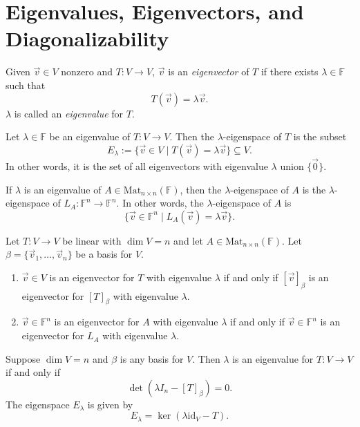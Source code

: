 \documentclass{article}
\newcommand{\secbreak}{\noindent \hrulefill \vspace{1cm}}
\begin{document}
\secbreak

\section*{Eigenvalues, Eigenvectors, and Diagonalizability}

\begin{definition}
Given \( \vec{v} \in V \) nonzero and \( T: V \to V \), \(\vec{v}\) is an \emph{eigenvector} of \( T \) if there exists \(\lambda \in \mathbb{F}\) such that 
\[
T(\vec{v}) = \lambda \vec{v}.
\]
\(\lambda\) is called an \emph{eigenvalue} for \( T \).
\end{definition}

\begin{definition}[Eigenspace]
Let \( \lambda \in \mathbb{F} \) be an eigenvalue of \( T: V \to V \). Then the \(\lambda\)-eigenspace of \( T \) is the subset 
\[
E_{\lambda} := \{ \vec{v} \in V \mid T(\vec{v}) = \lambda \vec{v} \} \subseteq V.
\]
In other words, it is the set of all eigenvectors with eigenvalue \(\lambda\) union \(\{\vec{0}\}\).

If \( \lambda \) is an eigenvalue of \( A \in \mathrm{Mat}_{n \times n}(\mathbb{F}) \), then the \(\lambda\)-eigenspace of \( A \) is the \(\lambda\)-eigenspace of \( L_A: \mathbb{F}^n \to \mathbb{F}^n \). In other words, the \(\lambda\)-eigenspace of \( A \) is 
\[
\{ \vec{v} \in \mathbb{F}^n \mid L_A(\vec{v}) = \lambda \vec{v} \}.
\]
\end{definition}

\begin{lemma}
Let \( T: V \to V \) be linear with \(\dim V = n\) and let \( A \in \mathrm{Mat}_{n \times n}(\mathbb{F}) \). Let \( \beta = \{ \vec{v}_1, \ldots, \vec{v}_n \} \) be a basis for \( V \).
\begin{enumerate}
    \item \( \vec{v} \in V \) is an eigenvector for \( T \) with eigenvalue \(\lambda\) if and only if \( [\vec{v}]_{\beta} \) is an eigenvector for \( [T]_{\beta} \) with eigenvalue \(\lambda\).
    \item \( \vec{v} \in \mathbb{F}^n \) is an eigenvector for \( A \) with eigenvalue \(\lambda\) if and only if \( \vec{v} \in \mathbb{F}^n \) is an eigenvector for \( L_A \) with eigenvalue \(\lambda\).
\end{enumerate}
\end{lemma}

\begin{theorem}
Suppose \(\dim V = n\) and \(\beta\) is any basis for \( V \). Then \(\lambda\) is an eigenvalue for \( T: V \to V \) if and only if 
\[
\det(\lambda I_n - [T]_{\beta}) = 0.
\]
The eigenspace \( E_{\lambda} \) is given by 
\[
E_{\lambda} = \ker(\lambda \mathrm{id}_V - T).
\]
\end{theorem}
\end{document}
